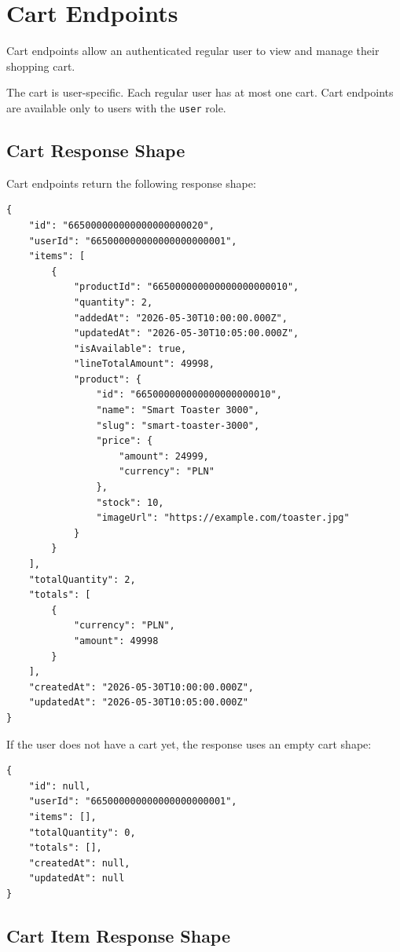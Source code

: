 \section{Cart Endpoints}

Cart endpoints allow an authenticated regular user to view and manage their shopping cart.

The cart is user-specific. Each regular user has at most one cart. Cart endpoints are available only to users with the \texttt{user} role.

\subsection{Cart Response Shape}

Cart endpoints return the following response shape:

\begin{verbatim}
{
    "id": "665000000000000000000020",
    "userId": "665000000000000000000001",
    "items": [
        {
            "productId": "665000000000000000000010",
            "quantity": 2,
            "addedAt": "2026-05-30T10:00:00.000Z",
            "updatedAt": "2026-05-30T10:05:00.000Z",
            "isAvailable": true,
            "lineTotalAmount": 49998,
            "product": {
                "id": "665000000000000000000010",
                "name": "Smart Toaster 3000",
                "slug": "smart-toaster-3000",
                "price": {
                    "amount": 24999,
                    "currency": "PLN"
                },
                "stock": 10,
                "imageUrl": "https://example.com/toaster.jpg"
            }
        }
    ],
    "totalQuantity": 2,
    "totals": [
        {
            "currency": "PLN",
            "amount": 49998
        }
    ],
    "createdAt": "2026-05-30T10:00:00.000Z",
    "updatedAt": "2026-05-30T10:05:00.000Z"
}
\end{verbatim}

\pagebreak
If the user does not have a cart yet, the response uses an empty cart shape:

\begin{verbatim}
{
    "id": null,
    "userId": "665000000000000000000001",
    "items": [],
    "totalQuantity": 0,
    "totals": [],
    "createdAt": null,
    "updatedAt": null
}
\end{verbatim}

\subsection{Cart Item Response Shape}

